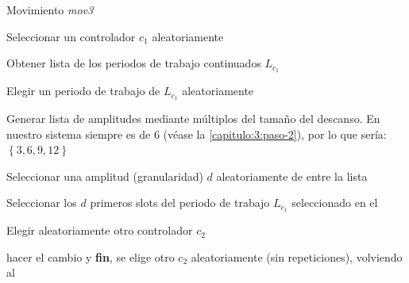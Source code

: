 \begin{algorithm}[h]
    \caption{Movimiento \textit{mov3}}
    \label{algoritmo:entorno-mov3}

    \SetAlgoNoLine
    \SetAlgoNoEnd
    \DontPrintSemicolon
    \LinesNumbered

    \bigskip


    Seleccionar un controlador $c_1$ aleatoriamente \; \label{line:c1}
    \algovspace

    Obtener lista de los periodos de trabajo continuados $L_{c_1}$
    \algovspace

    Elegir un periodo de trabajo de $L_{c_1}$ aleatoriamente \label{line:3} \;
    \algovspace

    Generar lista de amplitudes mediante múltiplos del tamaño del descanso. En nuestro sistema siempre es de 6 (véase la \autoref{capitulo:3:paso-2}), por lo que sería: $\left\lbrace 3,6,9,12\right\rbrace $ \;
    \algovspace

    Seleccionar una amplitud (granularidad) $d$ aleatoriamente de entre la lista \label{line:amplitud}\;
    \algovspace

    Seleccionar los $d$ primeros slots del periodo de trabajo $L_{c_1}$ seleccionado en el \; %
    \algovspace

    Elegir aleatoriamente otro controlador $c_2$ \label{line:c2}\;
    \algovspace

    {hacer el cambio y \textbf{fin}, }
    {se elige otro $c_2$ aleatoriamente (sin repeticiones), volviendo al }
    \algovspace

    \algovspace

    \algovspace

    \algovspace
\end{algorithm}


